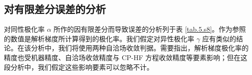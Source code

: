 \begin{table}[!ht]
\centering
\caption[HR46 与 T144 子集 $\symup{\Delta} \tilde \gamma_\textsf{CCSD}$ 在不同 FPA 模型下 RelRMSD]{HR46 与 T144 子集下异性极化率 $\symup{\Delta} \tilde \gamma_\textsf{CCSD}$ 在不同 FPA 模型下的相对方均根误差\textrm{\textsuperscript{\emph{a}}}。}
\label{tab.5.s6}
\end{table}

\subsection{对有限差分误差的分析}
\label{sec.5.s9}

对同性极化率 $\alpha$ 所作的因有限差分而导致误差的分析列于表 \ref{tab.5.s8}。作为参照的数值是解析梯度所计算得到的极化率。我们假定对异性极化率 $\gamma$ 应有类似的结论。在该分析中，我们将使用两种自洽场收敛判据。需要指出，解析梯度极化率的精度也受机器精度、自洽场收敛精度与 CP-HF 方程收敛精度等要素影响；但在这段分析中，我们假定这些影响要素可以忽略不计。

